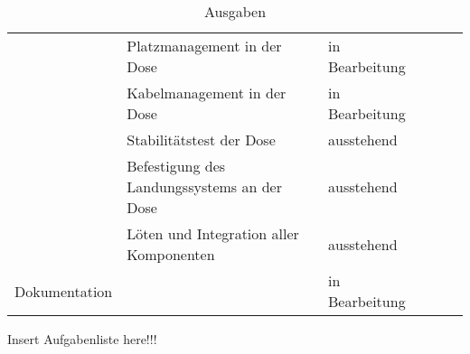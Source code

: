 \begin{table}[H]
\begin{tabular}{p{3cm}p{7cm}p{3cm}rrr}
	& Platzmanagement in der Dose & in Bearbeitung\\
	& Kabelmanagement in der Dose & in Bearbeitung\\
	& Stabilitätstest der Dose & ausstehend\\
	& Befestigung des Landungssystems an der Dose & ausstehend\\
	& Löten und Integration aller Komponenten & ausstehend\\
	\midrule
	Dokumentation & & in Bearbeitung\\
    \bottomrule
    \bottomrule
    \end{tabular}%
    \caption{Ausgaben}
  \label{tab:aufgabenliste_hardware}%
\end{table}%

Insert Aufgabenliste here!!!